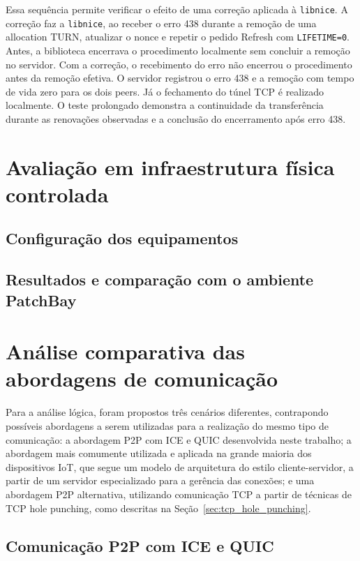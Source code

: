 Essa sequência permite verificar o efeito de uma correção aplicada
à \texttt{libnice}. A correção faz a \texttt{libnice}, ao receber o erro 438 durante a remoção de uma allocation TURN, atualizar o nonce e repetir o pedido Refresh com \texttt{LIFETIME=0}. Antes, a biblioteca encerrava o procedimento localmente sem concluir a remoção no servidor. Com a correção, o recebimento do erro não encerrou o procedimento antes da remoção efetiva. O servidor registrou o erro 438 e a remoção com tempo de vida zero para os dois peers. Já o fechamento do túnel TCP é realizado localmente. O teste prolongado demonstra a continuidade da transferência durante as renovações observadas e a conclusão do encerramento após erro 438.




\section{Avaliação em infraestrutura física controlada}
\subsection{Configuração dos equipamentos}
\subsection{Resultados e comparação com o ambiente PatchBay}






\section{Análise comparativa das abordagens de comunicação}
\label{sec:another_connection_approaches}

Para a análise lógica, foram propostos três cenários diferentes, contrapondo possíveis abordagens a serem utilizadas para a realização do mesmo tipo de comunicação: a abordagem P2P com ICE e QUIC desenvolvida neste trabalho; a abordagem mais comumente utilizada e aplicada na grande maioria dos dispositivos IoT, que segue um modelo de arquitetura do estilo cliente-servidor, a partir de um servidor especializado para a gerência das conexões; e uma abordagem P2P alternativa, utilizando comunicação TCP a partir de técnicas de TCP hole punching, como descritas na Seção~\ref{sec:tcp_hole_punching}.

\subsection{Comunicação P2P com ICE e QUIC}

